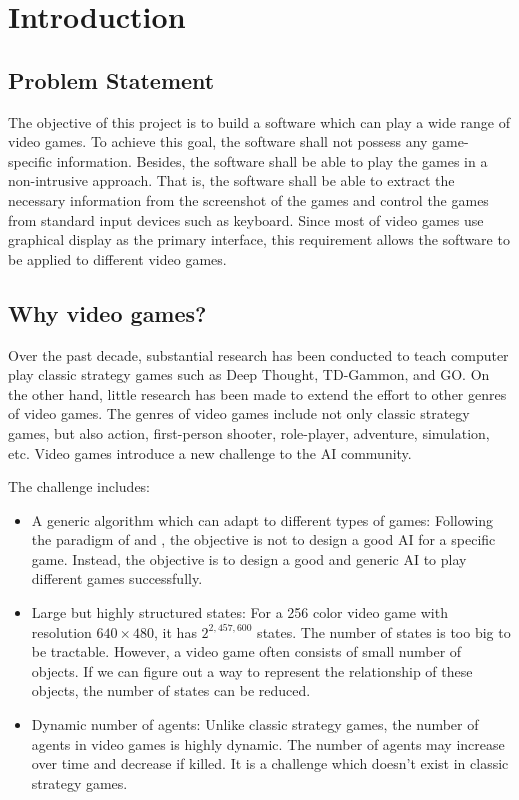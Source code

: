 
\chapter{Introduction}
\label{ch:intro}

\section{Problem Statement}
The objective of this project is to build a software which can play a wide range 
of video games. To achieve this goal, the software shall not possess any game-specific 
information. Besides, the software shall be able to play the games in a non-intrusive approach.
That is, the software shall be able to extract the necessary information 
from the screenshot of the games and control the games from standard input devices such as keyboard.
Since most of video games use graphical display as the primary interface, this requirement allows
the software to be applied to different video games.

\section{Why video games?}
Over the past decade, substantial research has been conducted to teach computer play classic strategy games such
as Deep Thought\cite{DeepBlue}, TD-Gammon\cite{Gammon}, and GO\cite{Go}.
On the other hand, little research has been made\cite{FPS}\cite{Mario} to extend the effort to other genres of video games.
The genres of video games include not only classic strategy games, but also action, first-person shooter, role-player, adventure, simulation, etc.
Video games introduce a new challenge to the AI community.

The challenge includes:
\begin{itemize}{}

\item A generic algorithm which can adapt to different types of games:
Following the paradigm of \cite{GGP} and \cite{Yavar}, the objective is not to design a good AI for
a specific game. Instead, the objective is to design a good and generic AI to play different games successfully.

\item Large but highly structured states:
For a 256 color video game with resolution $640 \times 480$, it has $2^{2,457,600}$ states.
The number of states is too big to be tractable. However, a video game often consists of small number of objects.
If we can figure out a way to represent the relationship of these objects, the number of states
can be reduced.

\item Dynamic number of agents:
Unlike classic strategy games, the number of agents in video games is highly dynamic.
The number of agents may increase over time and decrease if killed.
It is a challenge which doesn't exist in classic strategy games.
\end{itemize}

